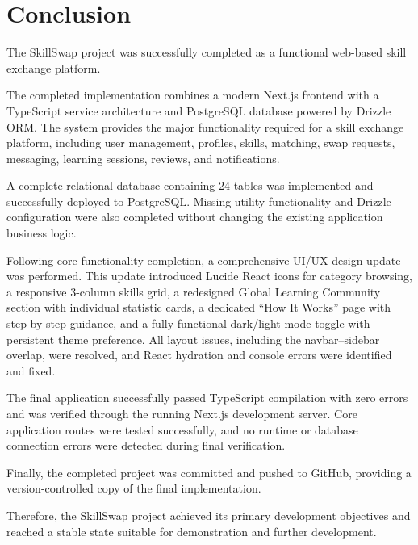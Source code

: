 \documentclass[12pt,a4paper]{report}
\begin{document}
\chapter{Conclusion}

The SkillSwap project was successfully completed as a functional web-based
skill exchange platform.

The completed implementation combines a modern Next.js frontend with a
TypeScript service architecture and PostgreSQL database powered by Drizzle ORM.
The system provides the major functionality required for a skill exchange
platform, including user management, profiles, skills, matching, swap requests,
messaging, learning sessions, reviews, and notifications.

A complete relational database containing 24 tables was implemented and
successfully deployed to PostgreSQL.  Missing utility functionality and Drizzle
configuration were also completed without changing the existing application
business logic.

Following core functionality completion, a comprehensive UI/UX design update
was performed.  This update introduced Lucide React icons for category
browsing, a responsive 3-column skills grid, a redesigned Global Learning
Community section with individual statistic cards, a dedicated ``How It Works''
page with step-by-step guidance, and a fully functional dark/light mode toggle
with persistent theme preference.  All layout issues, including the
navbar--sidebar overlap, were resolved, and React hydration and console errors
were identified and fixed.

The final application successfully passed TypeScript compilation with zero
errors and was verified through the running Next.js development server.  Core
application routes were tested successfully, and no runtime or database
connection errors were detected during final verification.

Finally, the completed project was committed and pushed to GitHub, providing a
version-controlled copy of the final implementation.

Therefore, the SkillSwap project achieved its primary development objectives and
reached a stable state suitable for demonstration and further development.

\end{document}
